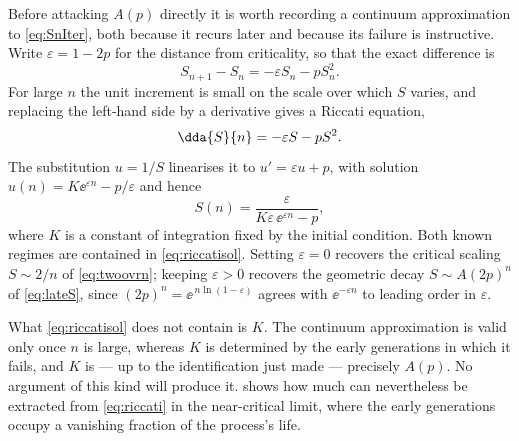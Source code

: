 Before attacking $A(p)$ directly it is worth recording a continuum approximation to
\cref{eq:SnIter}, both because it recurs later and because its failure is instructive.
Write $\varepsilon = 1-2p$ for the distance from criticality, so that the exact
difference is
\begin{equation}
\label{eq:Sdiff}
S_{n+1}-S_n = -\varepsilon S_n - pS_n^2 .
\end{equation}
For large $n$ the unit increment is small on the scale over which $S$ varies, and
replacing the left-hand side by a derivative gives a Riccati equation,
\begin{equation}
\label{eq:riccati}
\dda{S}{n} = -\varepsilon S - pS^2 .
\end{equation}
The substitution $u=1/S$ linearises it to $u' = \varepsilon u + p$, with solution
$u(n) = K\ee^{\varepsilon n} - p/\varepsilon$ and hence
\begin{equation}
\label{eq:riccatisol}
S(n) = \frac{\varepsilon}{K\varepsilon\,\ee^{\varepsilon n} - p},
\end{equation}
where $K$ is a constant of integration fixed by the initial condition. Both known
regimes are contained in \cref{eq:riccatisol}. Setting $\varepsilon=0$ recovers the
critical scaling $S\sim2/n$ of \cref{eq:twoovrn}; keeping $\varepsilon>0$ recovers the
geometric decay $S\sim A(2p)^n$ of \cref{eq:lateS}, since
$(2p)^n = \ee^{\,n\ln(1-\varepsilon)}$ agrees with $\ee^{-\varepsilon n}$ to leading
order in $\varepsilon$.

What \cref{eq:riccatisol} does not contain is $K$. The continuum approximation is valid
only once $n$ is large, whereas $K$ is determined by the early generations in which it
fails, and $K$ is --- up to the identification just made --- precisely $A(p)$. No
argument of this kind will produce it.  shows how much can
nevertheless be extracted from \cref{eq:riccati} in the near-critical limit, where the
early generations occupy a vanishing fraction of the process's life.

\FloatBarrier
